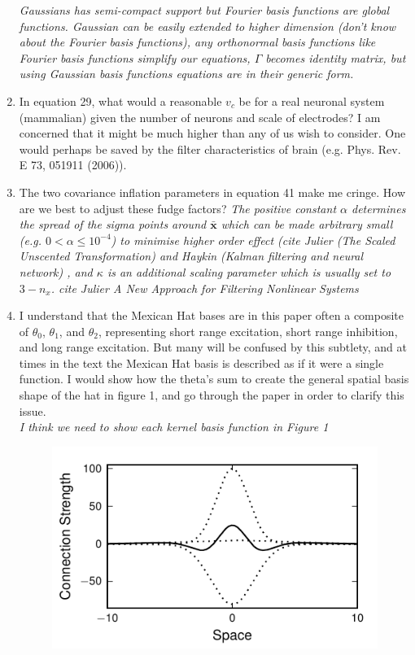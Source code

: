 \documentclass{article}
\begin{document}
\begin{enumerate}
\emph{Gaussians has semi-compact support but Fourier basis functions are global functions. Gaussian can be easily extended to higher dimension (don't know about the Fourier basis functions), any orthonormal basis functions like Fourier basis functions simplify our equations, $\Gamma$ becomes identity matrix, but using Gaussian basis functions equations are in their generic form.}

\item In equation 29, what would a reasonable $v_c$ be for a real neuronal system (mammalian) given the number of neurons and scale of electrodes? I am concerned that it might be much higher than any of us wish to consider. One would perhaps be saved by the filter characteristics of brain (e.g. Phys. Rev. E 73, 051911 (2006)).
\item The two covariance inflation parameters in equation 41 make me cringe. How are we best to adjust these fudge factors?
\emph{The positive constant $\alpha$ determines the spread of the sigma points around $\mathbf{\bar x}$ which can be made arbitrary small (e.g. $0<\alpha\le 10^{-4} $) to minimise higher order effect (cite Julier (The Scaled Unscented Transformation) and  Haykin (Kalman filtering and neural network) , and  $\kappa$ is an additional scaling parameter which is usually set to $3-n_x$. cite Julier A New Approach for Filtering Nonlinear Systems}



\item I understand that the Mexican Hat bases are in this paper often a composite of $\theta_0$, $\theta_1$, and $\theta_2$, representing short range excitation, short range inhibition, and long range excitation. But many will be confused by this subtlety, and at times in the text the Mexican Hat basis is described as if it were a single function. I would show how the theta's sum to create the general spatial basis shape of the hat in figure 1, and go through the paper in order to clarify this issue.\\
\emph{I think we need to show each kernel basis function in Figure 1}
 \begin{figure}[!ht]
 \begin{center}
 \includegraphics{./Graph/pdf/fig1_revised.pdf} 
 \end{center}
 \caption{}
 \label{fig:Figure1}
 \end{figure}


\end{enumerate}
\end{document}

